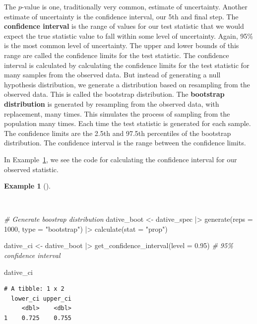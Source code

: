 \documentclass[
  letterpaper,
]{book}
\newenvironment{Shaded}{\begin{snugshade}}{\end{snugshade}}
\newcommand{\AttributeTok}[1]{\textcolor[rgb]{0.00,0.00,0.00}{#1}}
\newcommand{\CommentTok}[1]{\textcolor[rgb]{0.00,0.00,0.00}{\textit{#1}}}
\newcommand{\DecValTok}[1]{\textcolor[rgb]{0.00,0.00,0.00}{#1}}
\newcommand{\FloatTok}[1]{\textcolor[rgb]{0.00,0.00,0.00}{#1}}
\newcommand{\FunctionTok}[1]{\textcolor[rgb]{0.00,0.00,0.00}{#1}}
\newcommand{\NormalTok}[1]{\textcolor[rgb]{0.00,0.00,0.00}{#1}}
\newcommand{\OtherTok}[1]{\textcolor[rgb]{0.00,0.00,0.00}{#1}}
\newcommand{\SpecialCharTok}[1]{\textcolor[rgb]{0.00,0.00,0.00}{#1}}
\newcommand{\StringTok}[1]{\textcolor[rgb]{0.00,0.00,0.00}{#1}}
\theoremstyle{definition}
\newtheorem{example}{Example}[chapter]
\theoremstyle{remark}
\begin{document}
The \(p\)-value is one, traditionally very common, estimate of
uncertainty. Another estimate of uncertainty is the confidence interval,
our 5th and final step. The \textbf{confidence interval} is the range of
values for our test statistic that we would expect the true statistic
value to fall within some level of uncertainty. Again, 95\% is the most
common level of uncertainty. The upper and lower bounds of this range
are called the confidence limits for the test statistic. The confidence
interval is calculated by calculating the confidence limits for the test
statistic for many samples from the observed data. But instead of
generating a null hypothesis distribution, we generate a distribution
based on resampling from the observed data. This is called the bootstrap
distribution. The \textbf{bootstrap distribution} is generated by
resampling from the observed data, with replacement, many times. This
simulates the process of sampling from the population many times. Each
time the test statistic is generated for each sample. The confidence
limits are the 2.5th and 97.5th percentiles of the bootstrap
distribution. The confidence interval is the range between the
confidence limits.

In Example~\ref{exm-infer-cat-confidence-interval}, we see the code for
calculating the confidence interval for our observed statistic.

\begin{example}[]\protect\hypertarget{exm-infer-cat-confidence-interval}{}\label{exm-infer-cat-confidence-interval}

~

\begin{Shaded}
\begin{Highlighting}[]
\CommentTok{\# Generate boostrap distribution}
\NormalTok{dative\_boot }\OtherTok{\textless{}{-}}
\NormalTok{  dative\_spec }\SpecialCharTok{|\textgreater{}}
  \FunctionTok{generate}\NormalTok{(}\AttributeTok{reps =} \DecValTok{1000}\NormalTok{, }\AttributeTok{type =} \StringTok{"bootstrap"}\NormalTok{) }\SpecialCharTok{|\textgreater{}}
  \FunctionTok{calculate}\NormalTok{(}\AttributeTok{stat =} \StringTok{"prop"}\NormalTok{)}

\NormalTok{dative\_ci }\OtherTok{\textless{}{-}}
\NormalTok{  dative\_boot }\SpecialCharTok{|\textgreater{}}
  \FunctionTok{get\_confidence\_interval}\NormalTok{(}\AttributeTok{level =} \FloatTok{0.95}\NormalTok{) }\CommentTok{\# 95\% confidence interval}

\NormalTok{dative\_ci}
\end{Highlighting}
\end{Shaded}

\begin{verbatim}
# A tibble: 1 x 2
  lower_ci upper_ci
     <dbl>    <dbl>
1    0.725    0.755
\end{verbatim}

\end{example}
\end{document}
